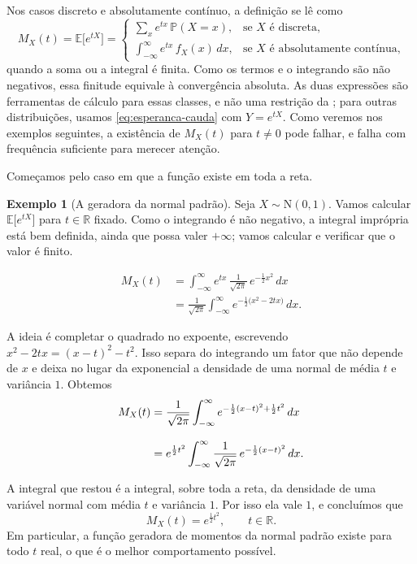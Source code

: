 \documentclass[12pt,portuguese]{article}
\theoremstyle{definition}
\newtheorem{example}[example]{Exemplo}
\theoremstyle{plainexercise}
\theoremstyle{starredexercise}
\theoremstyle{definition}
\begin{document}
Nos casos discreto e absolutamente contínuo, a definição se lê como
\begin{equation}\label{eq:fgm-casos}
M_X(t) = \mathbb{E}\bigl[e^{tX}\bigr] =
\begin{cases}
\displaystyle \sum_{x} e^{tx}\,\mathbb{P}(X=x), & \text{se } X \text{ é discreta,} 
\\[0.8cm]
\displaystyle \int_{-\infty}^{\infty} e^{tx}\,f_X(x)\,dx, & \text{se } X \text{ é absolutamente contínua,}
\end{cases}
\end{equation}
quando a soma ou a integral é finita. Como os termos e o integrando são
não negativos, essa finitude equivale à convergência absoluta. As duas
expressões são ferramentas de cálculo para essas classes, e não uma
restrição da ; para outras distribuições, usamos
\eqref{eq:esperanca-cauda} com $Y=e^{tX}$. Como veremos nos exemplos
seguintes, a existência de $M_X(t)$ para $t\neq0$ pode falhar, e falha com
frequência suficiente para merecer atenção.

\medskip

Começamos pelo caso em que a função existe em toda a reta.

\begin{example}[A geradora da normal padrão]\label{ex:fgm-normal}
Seja $X\sim\mathrm{N}(0,1)$. Vamos calcular $\mathbb{E}\bigl[e^{tX}\bigr]$ para
$t\in\mathbb{R}$ fixado. Como o integrando é não negativo, a integral imprópria
está bem definida, ainda que possa valer $+\infty$; vamos calcular e verificar
que o valor é finito.

\begin{align*}
M_X(t)
&= \int_{-\infty}^{\infty} e^{tx}\,\frac{1}{\sqrt{2\pi}}\,e^{-\frac{1}{2}x^2}\,dx
\\[0.3cm]
&= \frac{1}{\sqrt{2\pi}} \int_{-\infty}^{\infty}
e^{-\frac{1}{2}\bigl(x^2 - 2tx\bigr)}\,dx.
\end{align*}

A ideia é completar o quadrado no expoente, escrevendo
$x^2-2tx = (x-t)^2 - t^2$. Isso separa do integrando um fator que não depende
de $x$ e deixa no lugar da exponencial a densidade de uma normal de média $t$ e
variância $1$. Obtemos
\begin{align}
M_X(t)
&= \frac{1}{\sqrt{2\pi}} \int_{-\infty}^{\infty}
e^{-\frac{1}{2}(x-t)^2 + \frac{1}{2}t^2}\,dx
\notag \\[0.3cm]
&= e^{\frac{1}{2}t^2} \int_{-\infty}^{\infty}
\frac{1}{\sqrt{2\pi}}\,e^{-\frac{1}{2}(x-t)^2}\,dx.
\label{eq:fgm-normal-completamento}
\end{align}

A integral que restou é a integral, sobre toda a reta, da densidade de uma
variável normal com média $t$ e variância $1$. Por isso ela vale $1$, e
concluímos que
\[
M_X(t) = e^{\frac{1}{2}t^2}, \qquad t\in\mathbb{R}.
\]
Em particular, a função geradora de momentos da normal padrão existe para todo
$t$ real, o que é o melhor comportamento possível.
\end{example}
\end{document}
